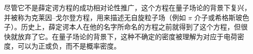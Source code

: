 尽管它不是薛定谔方程的成功相对论性推广，这个方程在量子场论的背景下复兴，并被称为克莱因–戈尔登方程，用来描述无自旋粒子场（例如 \(\pi\) 介子或希格斯玻色子）。历史上，薛定谔本人在他的名字所命名的方程之前就得到了这个方程，但很快就放弃了它。在量子场论的背景下，这种不确定的密度被理解为对应于电荷密度，可以为正或负，而不是概率密度。












































































































